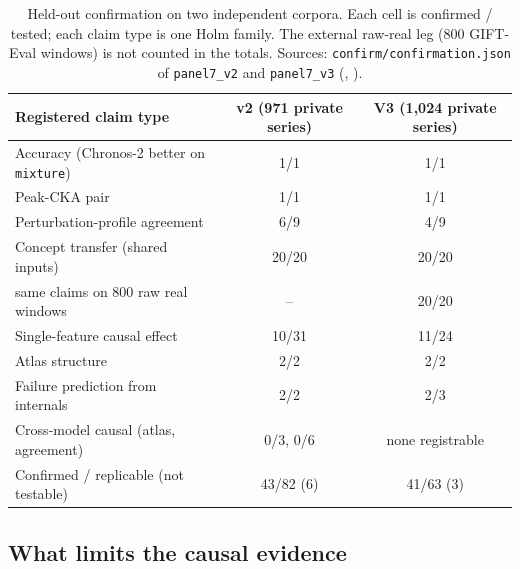 \begin{table}[tb]
\centering
\footnotesize
\begin{tabular}{@{}lcc@{}}
\toprule
Registered claim type & v2 (971 private series) & V3 (1{,}024 private series) \\
\midrule
Accuracy (Chronos-2 better on \texttt{mixture}) & 1/1 & 1/1 \\
Peak-CKA pair & 1/1 & 1/1 \\
Perturbation-profile agreement & 6/9 & 4/9 \\
Concept transfer (shared inputs) & 20/20 & 20/20 \\
\quad same claims on 800 raw real windows & -- & 20/20 \\
Single-feature causal effect & 10/31 & 11/24 \\
Atlas structure & 2/2 & 2/2 \\
Failure prediction from internals & 2/2 & 2/3 \\
Cross-model causal (atlas, agreement) & 0/3, 0/6 & none registrable \\
\midrule
Confirmed / replicable (not testable) & 43/82 (6) & 41/63 (3) \\
\bottomrule
\end{tabular}
\caption{Held-out confirmation on two independent corpora. Each cell is confirmed / tested; each claim type is one Holm
family. The external raw-real leg (800 GIFT-Eval windows) is not counted in the totals. Sources:
\texttt{confirm/confirmation.json} of \texttt{panel7\_v2} and \texttt{panel7\_v3} (, ).}
\label{tab:v3}
\end{table}

\subsection{What limits the causal evidence}
\label{sec:limits}

